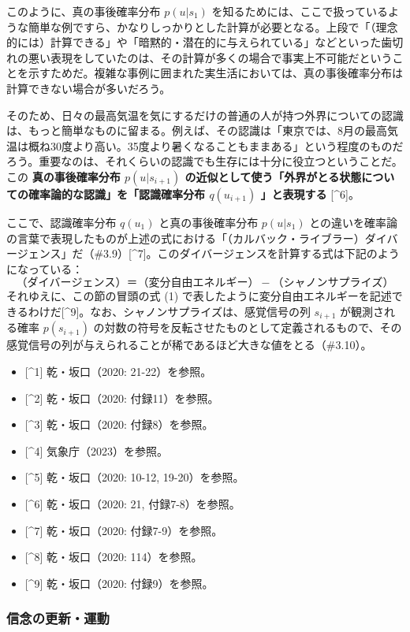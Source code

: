 このように、真の事後確率分布 \(p(u|s_1)\)
を知るためには、ここで扱っているような簡単な例ですら、かなりしっかりとした計算が必要となる。上段で「（理念的には）計算できる」や「暗黙的・潜在的に与えられている」などといった歯切れの悪い表現をしていたのは、その計算が多くの場合で事実上不可能だということを示すためだ。複雑な事例に囲まれた実生活においては、真の事後確率分布は計算できない場合が多いだろう。

そのため、日々の最高気温を気にするだけの普通の人が持つ外界についての認識は、もっと簡単なものに留まる。例えば、その認識は「東京では、8月の最高気温は概ね30度より高い。35度より暑くなることもままある」という程度のものだろう。重要なのは、それくらいの認識でも生存には十分に役立つということだ。この
\textbf{真の事後確率分布 \(p(u|s_{i+1})\)
の近似として使う「外界がとる状態についての確率論的な認識」を「認識確率分布
\(q(u_{i+1})\) 」と表現する} {[}\^{}6{]}。

ここで、認識確率分布 \(q(u_1)\) と真の事後確率分布 \(p(u|s_1)\)
との違いを確率論の言葉で表現したものが上述の式における「（カルバック・ライブラー）ダイバージェンス」だ（\#3.9）{[}\^{}7{]}。このダイバージェンスを計算する式は下記のようになっている：
\[
（ダイバージェンス）＝（変分自由エネルギー）-（シャノンサプライズ）\tag{2}
\] それゆえに、この節の冒頭の式 (1)
で表したように変分自由エネルギーを記述できるわけだ{[}\^{}9{]}。なお、シャノンサプライズは、感覚信号の列
\(s_{i+1}\) が観測される確率 \(p(s_{i+1})\)
の対数の符号を反転させたものとして定義されるもので、その感覚信号の列が与えられることが稀であるほど大きな値をとる（\#3.10）。

\begin{itemize}
\tightlist
\item
  {[}\^{}1{]} 乾・坂口（2020: 21-22）を参照。
\item
  {[}\^{}2{]} 乾・坂口（2020: 付録11）を参照。
\item
  {[}\^{}3{]} 乾・坂口（2020: 付録8）を参照。
\item
  {[}\^{}4{]} 気象庁（2023）を参照。
\item
  {[}\^{}5{]} 乾・坂口（2020: 10-12, 19-20）を参照。
\item
  {[}\^{}6{]} 乾・坂口（2020: 21, 付録7-8）を参照。
\item
  {[}\^{}7{]} 乾・坂口（2020: 付録7-9）を参照。
\item
  {[}\^{}8{]} 乾・坂口（2020: 114）を参照。
\item
  {[}\^{}9{]} 乾・坂口（2020: 付録9）を参照。
\end{itemize}

\subsubsection{信念の更新・運動}\label{ux4fe1ux5ff5ux306eux66f4ux65b0ux904bux52d5}

